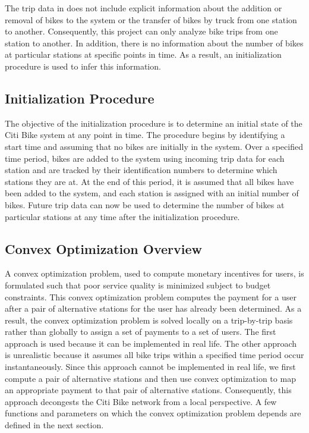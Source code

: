\documentclass[times, 10pt,twocolumn]{article}
\begin{document}
The trip data in \cite{dataset} does not include explicit information about the addition or removal of bikes to the system or the transfer of bikes by truck from one station to another. Consequently, this project can only analyze bike trips from one station to another. In addition, there is no information about the number of bikes at particular stations at specific points in time. As a result, an initialization procedure is used to infer this information.

\subsection{Initialization Procedure}
The objective of the initialization procedure is to determine an initial state of the Citi Bike system at any point in time. The procedure begins by identifying a start time and assuming that no bikes are initially in the system. Over a specified time period, bikes are added to the system using incoming trip data for each station and are tracked by their identification numbers to determine which stations they are at. At the end of this period, it is assumed that all bikes have been added to the system, and each station is assigned with an initial number of bikes. Future trip data can now be used to determine the number of bikes at particular stations at any time after the initialization procedure.

\subsection{Convex Optimization Overview}

A convex optimization problem, used to compute monetary incentives for users, is formulated such that poor service quality is minimized subject to budget constraints. This convex optimization problem computes the payment for a user after a pair of alternative stations for the user has already been determined. As a result, the convex optimization problem is solved locally on a trip-by-trip basis rather than globally to assign a set of payments to a set of users. The first approach is used because it can be implemented in real life. The other approach is unrealistic because it assumes all bike trips within a specified time period occur instantaneously. Since this approach cannot be implemented in real life, we first compute a pair of alternative stations and then use convex optimization to map an appropriate payment to that pair of alternative stations. Consequently, this approach decongests the Citi Bike network from a local perspective. A few functions and parameters on which the convex optimization problem depends are defined in the next section.
\end{document}
